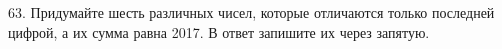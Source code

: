 63. Придумайте шесть различных чисел, которые отличаются только последней цифрой, а их сумма равна 2017. В ответ запишите их через запятую.\\
